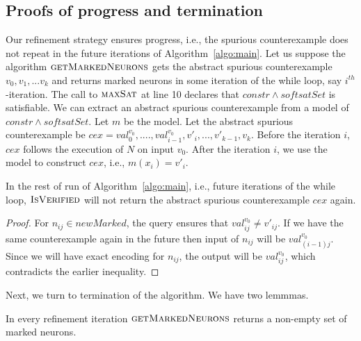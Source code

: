 \subsection{Proofs of progress and termination}
Our refinement strategy ensures progress, i.e., the spurious counterexample does not repeat in the future iterations of Algorithm~\ref{algo:main}. Let us suppose the algorithm
$\textsc{getMarkedNeurons}$ gets the abstract spurious counterexample
${v_0}, {v_1}, ... {v_k}$ and
returns marked neurons in some iteration of the while loop, say $i^{th}$-iteration.
The call to $\textsc{maxSat}{}$ at line 10
declares that $constr \land softsatSet$ is satisfiable.
We can extract an abstract spurious counterexample from a model
of $constr \land softsatSet$.
Let $m$ be the model.
Let the abstract spurious counterexample be $cex = val_0^{v_0}, ...., val^{v_0}_{i-1},v'_{i},...,v'_{k-1},v_k$.
Before the iteration $i$, $cex$ follows the execution of $N$ on input $v_0$.
After the iteration $i$, we use the model to construct $cex$, i.e., $m(x_i) = v'_i$.

  \begin{lemma}
  In the rest of run of Algorithm~\ref{algo:main}, i.e., future iterations of the while loop, $\textsc{IsVerified}$ will not return the abstract spurious counterexample  $cex$ again.
  \end{lemma}
\begin{proof}
  For $n_{ij} \in newMarked$, the \maxsat{} query ensures that
  $val^{v_0}_{ij} \neq v'_{ij}$.
  If we have the same counterexample again in the future then
  input of $n_{ij}$ will be $val^{v_0}_{(i-1)j}$.
  Since we will have exact encoding for $n_{ij}$, the output
  will be $val^{v_0}_{ij}$, which contradicts the earlier inequality.  
\end{proof}





Next, we turn to termination of the algorithm. We have two lemmmas.

\begin{lemma}
  \label{th:progress1}
  In every refinement iteration $\textsc{getMarkedNeurons}$
  returns a non-empty set of marked neurons. 
\end{lemma}

